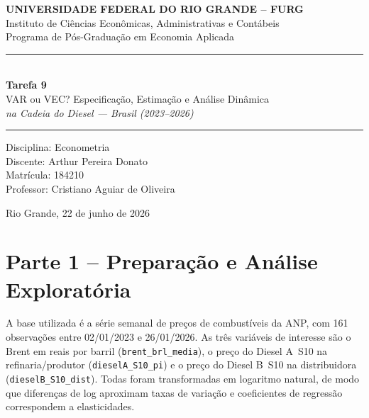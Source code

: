 \documentclass[12pt,a4paper]{article}
\begin{document}
\thispagestyle{empty}
\begin{center}
  {\large\bfseries UNIVERSIDADE FEDERAL DO RIO GRANDE -- FURG}\\[0.3em]
  {\normalsize Instituto de Ciências Econômicas, Administrativas e Contábeis}\\
  {\normalsize Programa de Pós-Graduação em Economia Aplicada}
\end{center}

\vspace{3.5cm}
\begin{center}
  \rule{\linewidth}{0.6pt}\\[0.6em]
  {\LARGE\bfseries Tarefa 9}\\[0.4em]
  {\large VAR ou VEC? Especificação, Estimação e Análise Dinâmica}\\[0.2em]
  {\large\itshape na Cadeia do Diesel --- Brasil (2023--2026)}\\[0.4em]
  \rule{\linewidth}{0.6pt}
\end{center}

\vspace{3cm}
\begin{center}
  Disciplina: Econometria\\[0.4em]
  Discente: Arthur Pereira Donato\\[0.2em]
  Matrícula: 184210\\[0.2em]
  Professor: Cristiano Aguiar de Oliveira
\end{center}

\vspace{4cm}
\begin{center}
  Rio Grande, 22 de junho de 2026
\end{center}

\newpage

\tableofcontents
\newpage

\section{Parte 1 -- Preparação e Análise Exploratória}

A base utilizada é a série semanal de preços de combustíveis da ANP,
com 161 observações entre 02/01/2023 e 26/01/2026.
As três variáveis de interesse são o Brent em reais por barril
(\texttt{brent\_brl\_media}), o preço do Diesel A~S10 na refinaria/produtor
(\texttt{dieselA\_S10\_pi}) e o preço do Diesel B~S10 na distribuidora
(\texttt{dieselB\_S10\_dist}).
Todas foram transformadas em logaritmo natural, de modo que diferenças
de log aproximam taxas de variação e coeficientes de regressão
correspondem a elasticidades.
\end{document}
